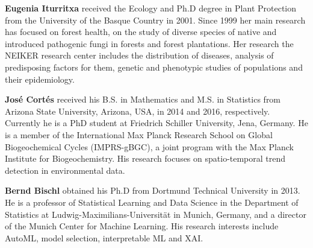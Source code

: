 \documentclass[remotesensing,article,submit,moreauthors,pdftex]{Definitions/mdpi}
\begin{document}
\bio
{}
{\textbf{Eugenia Iturritxa} received the Ecology and Ph.D degree in Plant Protection from the University of the Basque Country in 2001.
	Since 1999 her main research has focused on forest health, on the study of diverse species of native and introduced pathogenic fungi in forests and forest plantations.
	Her research the NEIKER research center includes the distribution of diseases, analysis of predisposing factors for them, genetic and phenotypic studies of populations and their epidemiology.}

\bio
{}
{\textbf{José Cortés} received his B.S. in Mathematics and M.S. in Statistics from Arizona State University, Arizona, USA, in 2014 and 2016, respectively.
	Currently he is a PhD student at Friedrich Schiller University, Jena, Germany.
	He is a member of the International Max Planck Research School on Global Biogeochemical Cycles (IMPRS-gBGC), a joint program with the Max Planck Institute for Biogeochemistry.
	His research focuses on spatio-temporal trend detection in environmental data.}

\bio
{}
{\textbf{Bernd Bischl} obtained his Ph.D from Dortmund Technical University in 2013.
	He is a professor of Statistical Learning and Data Science in the Department of Statistics at Ludwig-Maximilians-Universität in Munich, Germany, and a director of the Munich Center for Machine Learning.
	His research interests include AutoML, model selection, interpretable ML and XAI.}
\end{document}
